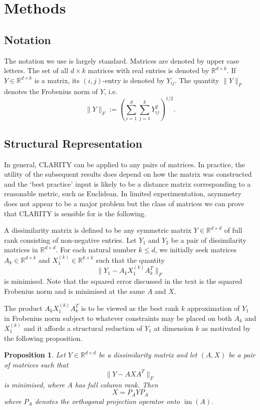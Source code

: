 \documentclass[a4]{article}
\newtheorem{prop}[thm]{Proposition}
\newcommand{\+}[1]{\mathbf{#1}}
\newcommand{\R}{\mathbb{R}}
\newcommand{\norm}[1]{\|#1\|}
\newcommand{\im}{\operatorname{im}}
\begin{document}
\section{Methods}

\label{sec:methods}

\subsection{Notation} The notation we use is largely standard. Matrices are denoted by upper case letters. The set of all $d \times k$ matrices with real entries is denoted by $\R^{d \times k}$. If $Y \in \R^{d \times k}$ is a matrix, its $(i,j)$-entry is denoted by $Y_{ij}$. The quantity $\norm{Y}_{F}$ denotes the Frobenius norm of $Y$, i.e.
\[ \norm{Y}_{F} := \left(\sum_{i = 1}^{d} \sum_{j = 1}^{k} Y_{ij}^{2} \right)^{1/2}.\] 

\subsection{Structural Representation}
\label{sec:methodsmath}
In general, CLARITY can be applied to any pairs of matrices. In practice, the utility of the subsequent results does depend on how the matrix was constructed and the `best practice' input is likely to be a distance matrix corresponding to a reasonable metric, such as Euclidean. In limited experimentation, asymmetry does not appear to be a major problem but the class of matrices we can prove that CLARITY is sensible for is the following.

A dissimilarity matrix is defined to be any symmetric matrix $Y \in \R^{d \times d}$ of full rank consisting of non-negative entries. Let $Y_{1}$ and $Y_{2}$ be a pair of dissimilarity matrices in $\R^{d \times d}$. For each natural number $k \leq d$, we initially seek matrices $A_{k} \in \R^{d \times k}$ and $X_{1}^{(k)} \in \R^{k \times k}$ such that the quantity
\[ \norm{Y_{1} - A_{k}X_{1}^{(k)}A_{k}^{T}}_{F} \] is minimised. Note that the squared error discussed in the text is the squared Frobenius norm and is minimised at the same $A$ and $X$.

The product $A_{k} X_{1}^{(k)} A_{k}^{T}$ is to be viewed as the best rank $k$ approximation of $Y_{1}$ in Frobenius norm subject to whatever constraints may be placed on both $A_{k}$ and $X^{(k)}_{1}$ and it affords a structural reduction of $Y_{1}$ at dimension $k$ as motivated by the following proposition.

\begin{prop} 
\label{prop:minproj} Let $Y \in \R^{d \times d}$ be a dissimilarity matrix and let $(A, X)$ be a pair of matrices such that 
\[ \norm{Y - AXA^{T}}_{F} \] is minimised, where $A$ has full column rank. Then 
\[ X = P_{A}YP_{A} \] where $P_{A}$ denotes the orthogonal projection operator onto $\im(A)$. 
\end{prop} 
\end{document}
